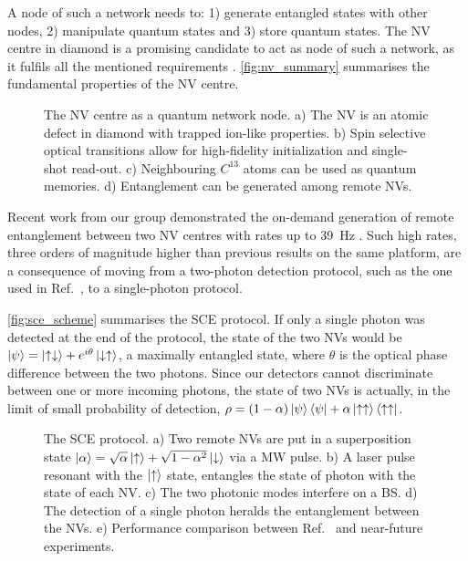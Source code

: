 \documentclass[a4paper, twoside]{article}
\begin{document}
A node of such a network needs to: 1) generate entangled states with other nodes, 2) manipulate quantum states and 3) store quantum states. The \ac{NV} centre in diamond is a promising candidate to act as node of such a network, as it fulfils all the mentioned requirements \cite{Awschalom2018}. \autoref{fig:nv_summary} summarises the fundamental properties of the \ac{NV} centre.

\begin{figure}
	\caption{The \ac{NV} centre as a quantum network node. a) The \ac{NV} is an atomic defect in diamond with trapped ion-like properties. b) Spin selective optical transitions allow for high-fidelity initialization and single-shot read-out. c) Neighbouring $C^{13}$ atoms can be used as quantum memories. d) Entanglement can be generated among remote \acp{NV}.}
	\label{fig:nv_summary}
\end{figure}

Recent work from our group demonstrated the on-demand generation of remote entanglement between two \ac{NV} centres with rates up to \SI{39}{\Hz} \cite{Humphreys2018}. Such high rates, three orders of magnitude higher than previous results on the same platform, are a consequence of moving from a two-photon detection protocol, such as the one used in Ref.~\cite{Hensen2015}, to a single-photon protocol.

\autoref{fig:sce_scheme} summarises the \ac{SCE} protocol. If only a single photon was detected at the end of the protocol, the state of the two \acp{NV} would be $\ket\psi = \ket{\uparrow\downarrow} + e^{i\theta}\ket{\downarrow\uparrow}$, a maximally entangled state, where $\theta$ is the optical phase difference between the two photons. Since our detectors cannot discriminate between one or more incoming photons, the state of two \acp{NV} is actually, in the limit of small probability of detection, $\rho = (1-\alpha)\ket\psi\bra\psi + \alpha\ket{\uparrow\uparrow}\bra{\uparrow\uparrow}$.

\begin{figure}
	\caption{The \acf{SCE} protocol.
	a) Two remote \acp{NV} are put in a superposition state $\ket\alpha = \sqrt\alpha\ket\uparrow + \sqrt{1-\alpha^2}\ket\downarrow$ via a \ac{MW} pulse.
	b) A laser pulse resonant with the $\ket\uparrow$ state, entangles the state of photon with the state of each \ac{NV}.
	c) The two photonic modes interfere on a \ac{BS}.
	d) The detection of a single photon heralds the entanglement between the \acp{NV}.
	e) Performance comparison between Ref.~\cite{Humphreys2018} and near-future experiments.}
	\label{fig:sce_scheme}
\end{figure}
\end{document}
